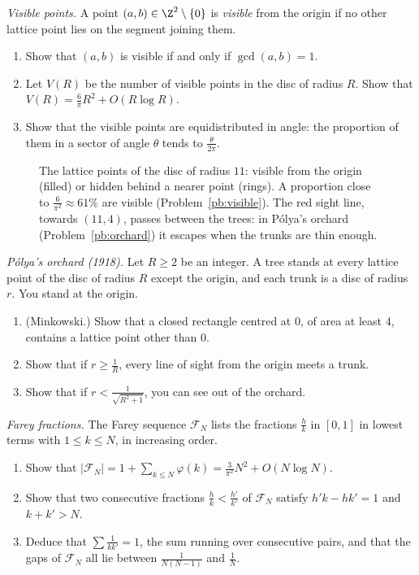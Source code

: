\begin{exercise}[$\star\star$]\label{pb:visible}
\emph{Visible points.} A point $(a,b)\in\Z^2\setminus\{0\}$ is \emph{visible} from the origin if no other lattice point lies on the
segment joining them.
\begin{enumerate}[label=(\alph*)]
\item Show that $(a,b)$ is visible if and only if $\gcd(a,b)=1$.
\item Let $V(R)$ be the number of visible points in the disc of radius $R$. Show that $V(R)=\frac6\pi R^2+O(R\log R)$.
\item Show that the visible points are equidistributed in angle: the proportion of them in a sector of angle $\theta$ tends to
$\frac\theta{2\pi}$.
\end{enumerate}
\end{exercise}

\begin{figure}[ht]
\centering
{}
\caption{The lattice points of the disc of radius $11$: visible from the origin (filled) or hidden behind a nearer point (rings).
A proportion close to $\frac6{\pi^2}\approx61\%$ are visible (Problem~\ref{pb:visible}). The red sight line, towards $(11,4)$,
passes between the trees: in Pólya's orchard (Problem~\ref{pb:orchard}) it escapes when the trunks are thin enough.}
\label{fig:visible}
\end{figure}

\begin{exercise}[$\star\star$]\label{pb:orchard}
\emph{Pólya's orchard (1918).} Let $R\ge2$ be an integer. A tree stands at every lattice point of the disc of radius $R$ except
the origin, and each trunk is a disc of radius $r$. You stand at the origin.
\begin{enumerate}[label=(\alph*)]
\item (Minkowski.) Show that a closed rectangle centred at $0$, of area at least $4$, contains a lattice point other than $0$.
\item Show that if $r\ge\frac1R$, every line of sight from the origin meets a trunk.
\item Show that if $r<\frac1{\sqrt{R^2+1}}$, you can see out of the orchard.
\end{enumerate}
\end{exercise}

\begin{exercise}[$\star\star$]\label{pb:farey}
\emph{Farey fractions.} The Farey sequence $\mathcal F_N$ lists the fractions $\frac hk$ in $[0,1]$ in lowest terms with $1\le k\le N$,
in increasing order.
\begin{enumerate}[label=(\alph*)]
\item Show that $|\mathcal F_N|=1+\sum_{k\le N}\varphi(k)=\frac3{\pi^2}N^2+O(N\log N)$.
\item Show that two consecutive fractions $\frac hk<\frac{h'}{k'}$ of $\mathcal F_N$ satisfy $h'k-hk'=1$ and $k+k'>N$.
\item Deduce that $\sum\frac1{kk'}=1$, the sum running over consecutive pairs, and that the gaps of $\mathcal F_N$ all lie between
$\frac1{N(N-1)}$ and $\frac1N$.
\end{enumerate}
\end{exercise}

